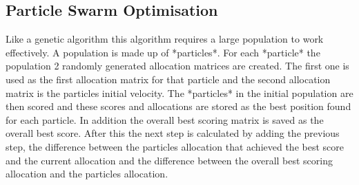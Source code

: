 \subsection{Particle Swarm Optimisation}

Like a genetic algorithm this algorithm requires a large population to work effectively. A population is made up of *particles*. For each *particle* the population 2 randomly generated allocation matrices are created. The first one is used as the first allocation matrix for that particle and the second allocation matrix is the particles initial velocity. The *particles* in the initial population are then scored and these scores and allocations are stored as the best position found for each particle. In addition the overall best scoring matrix is saved as the overall best score. After this the next step is calculated by adding the previous step, the difference between the particles allocation that achieved the best score and the current allocation and the difference between the overall best scoring allocation and the particles allocation.
